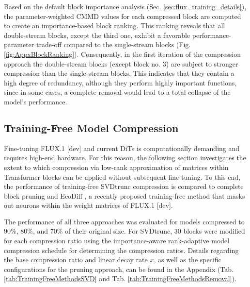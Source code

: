 Based on the default block importance analysis (Sec. \ref{sec:flux_training_details}), the parameter-weighted \gls{CMMD} values for each compressed block are computed to create an importance-based block ranking. This ranking reveals that all double-stream blocks, except the third one, exhibit a favorable performance-parameter trade-off compared to the single-stream blocks (Fig. \ref{fig:AppxBlockRanking}). Consequently, in the first iteration of the compression approach the double-stream blocks (except block no. 3) are subject to stronger compression than the single-stream blocks. This indicates that they contain a high degree of redundancy, although they perform highly important functions, since in some cases, a complete removal would lead to a total collapse of the model's performance.
%


\subsection{Training-Free Model Compression}
\label{sec:trainingFreeCompression}

Fine-tuning FLUX.1 {[dev]} and current \gls{DiT}s is computationally demanding and requires high-end hardware. For this reason, the following section investigates the extent to which compression via low-rank approximation of matrices within Transformer blocks can be applied without subsequent fine-tuning. To this end, the performance of training-free \gls{SVD}trunc compression is compared to complete block pruning and EcoDiff \cite{EcoDiff}, a recently proposed training-free method that masks out neurons within the weight matrices of FLUX.1 {[dev]}. 

The performance of all three approaches was evaluated for models compressed to 90\%, 80\%, and 70\% of their original size. For \gls{SVD}trunc, 30 blocks were modified for each compression ratio using the importance-aware rank-adaptive model compression schedule for determining the compression ratios. Details regarding the base compression ratio and linear decay rate $x$, as well as the specific configurations for the pruning approach, can be found in the Appendix (Tab. \ref{tab:TrainingFreeMethodsSVD} and Tab. \ref{tab:TrainingFreeMethodsRemoval}).



